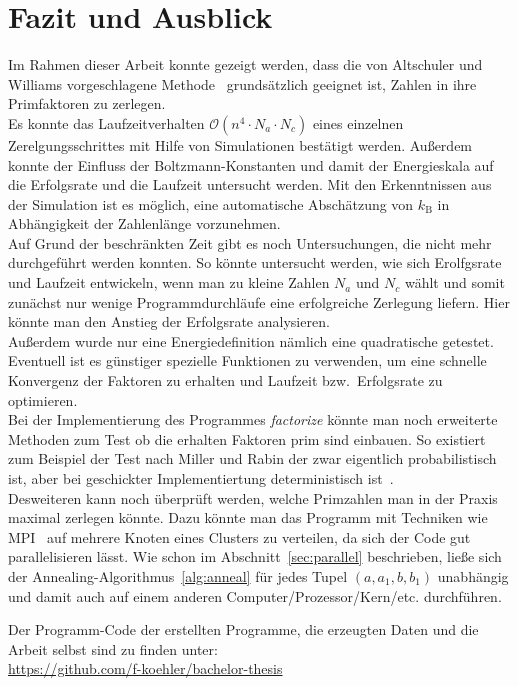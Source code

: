 \chapter{Fazit und Ausblick}\label{ch:conclusion}
Im Rahmen dieser Arbeit konnte gezeigt werden, dass die von Altschuler und Williams vorgeschlagene Methode~\parencite{altschuler} grundsätzlich geeignet ist, Zahlen in ihre Primfaktoren zu zerlegen. \\
Es konnte das Laufzeitverhalten $\mathcal{O}\left(n^4\cdot N_a \cdot N_c\right)$ eines einzelnen Zerelgungsschrittes mit Hilfe von Simulationen bestätigt werden. Außerdem konnte der Einfluss der Boltzmann-Konstanten und damit der Energieskala auf die Erfolgsrate und die Laufzeit untersucht werden. Mit den Erkenntnissen aus der Simulation ist es möglich, eine automatische Abschätzung von $k_\mathrm{B}$ in Abhängigkeit der Zahlenlänge vorzunehmen. \\
Auf Grund der beschränkten Zeit gibt es noch Untersuchungen, die nicht mehr durchgeführt werden konnten. So könnte untersucht werden, wie sich Erolfgsrate und Laufzeit entwickeln, wenn man zu kleine Zahlen $N_a$ und $N_c$ wählt und somit zunächst nur wenige Programmdurchläufe eine erfolgreiche Zerlegung liefern. Hier könnte man den Anstieg der Erfolgsrate analysieren.\\
Außerdem wurde nur eine Energiedefinition nämlich eine quadratische getestet. Eventuell ist es günstiger spezielle Funktionen zu verwenden, um eine schnelle Konvergenz der Faktoren zu erhalten und Laufzeit bzw.\ Erfolgsrate zu optimieren. \\
Bei der Implementierung des Programmes \textit{factorize} könnte man noch erweiterte Methoden zum Test ob die erhalten Faktoren prim sind einbauen. So existiert zum Beispiel der Test nach Miller und Rabin der zwar eigentlich probabilistisch ist, aber bei geschickter Implementiertung deterministisch ist~\parencite{miller}.\\
Desweiteren kann noch überprüft werden, welche Primzahlen man in der Praxis maximal zerlegen könnte. Dazu könnte man das Programm mit Techniken wie MPI~\parencite{mpi} auf mehrere Knoten eines Clusters zu verteilen, da sich der Code gut parallelisieren lässt. Wie schon im Abschnitt~\ref{sec:parallel} beschrieben, ließe sich der Annealing-Algorithmus~\ref{alg:anneal} für jedes Tupel $\left(a,a_1,b,b_1\right)$ unabhängig und damit auch auf einem anderen Computer/Prozessor/Kern/etc. durchführen.

\vfill
Der Programm-Code der erstellten Programme, die erzeugten Daten und die Arbeit selbst sind zu finden unter:\\
\url{https://github.com/f-koehler/bachelor-thesis}

